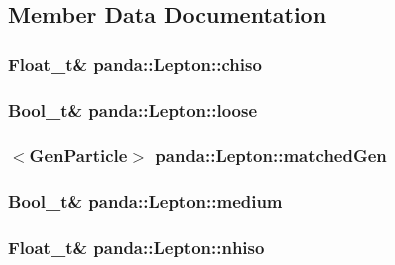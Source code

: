\subsection{Member Data Documentation}
\hypertarget{classpanda_1_1Lepton_a2332dfd260c6527fe3dbc4913fc0538e}{
\subsubsection[{chiso}]{\setlength{\rightskip}{0pt plus 5cm}Float\_\-t\& {\bf panda::Lepton::chiso}}}
\label{classpanda_1_1Lepton_a2332dfd260c6527fe3dbc4913fc0538e}
\hypertarget{classpanda_1_1Lepton_a4e452353086dde027d35df70060d74af}{
\subsubsection[{loose}]{\setlength{\rightskip}{0pt plus 5cm}Bool\_\-t\& {\bf panda::Lepton::loose}}}
\label{classpanda_1_1Lepton_a4e452353086dde027d35df70060d74af}
\hypertarget{classpanda_1_1Lepton_a84ee49be4ca28d17c553d9677f372f65}{
\subsubsection[{matchedGen}]{$<${\bf GenParticle}$>$ {\bf panda::Lepton::matchedGen}}}
\label{classpanda_1_1Lepton_a84ee49be4ca28d17c553d9677f372f65}
\hypertarget{classpanda_1_1Lepton_a128de197b4eb9e1108ba5cf911d03b3f}{
\subsubsection[{medium}]{\setlength{\rightskip}{0pt plus 5cm}Bool\_\-t\& {\bf panda::Lepton::medium}}}
\label{classpanda_1_1Lepton_a128de197b4eb9e1108ba5cf911d03b3f}
\hypertarget{classpanda_1_1Lepton_a617664cd1e7e3cec69842363cfcaca0c}{
\subsubsection[{nhiso}]{\setlength{\rightskip}{0pt plus 5cm}Float\_\-t\& {\bf panda::Lepton::nhiso}}}
